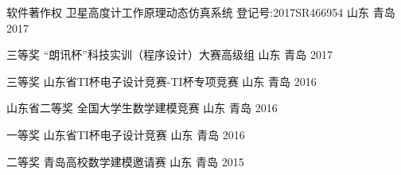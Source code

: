 
\begin{cvhonors}
  \cvhonor
    {软件著作权} %
    {卫星高度计工作原理动态仿真系统 \hspace{1em} 登记号:2017SR466954} %
    {山东 \textbullet 青岛} %
    {2017} %

  \cvhonor
    {三等奖} %
    {“朗讯杯”科技实训（程序设计）大赛高级组} %
    {山东 \textbullet 青岛} %
    {2017} %

  \cvhonor
    {三等奖} %
    {山东省TI杯电子设计竞赛-TI杯专项竞赛} %
    {山东 \textbullet 青岛} %
    {2016} %


  \cvhonor
    {山东省二等奖} %
    {全国大学生数学建模竞赛} %
    {山东 \textbullet 青岛} %
    {2016} %

  \cvhonor
    {一等奖} %
    {山东省TI杯电子设计竞赛} %
    {山东 \textbullet 青岛} %
    {2016} %


  \cvhonor
    {二等奖} %
    {青岛高校数学建模邀请赛} %
    {山东 \textbullet 青岛} %
    {2015} %

\end{cvhonors}
